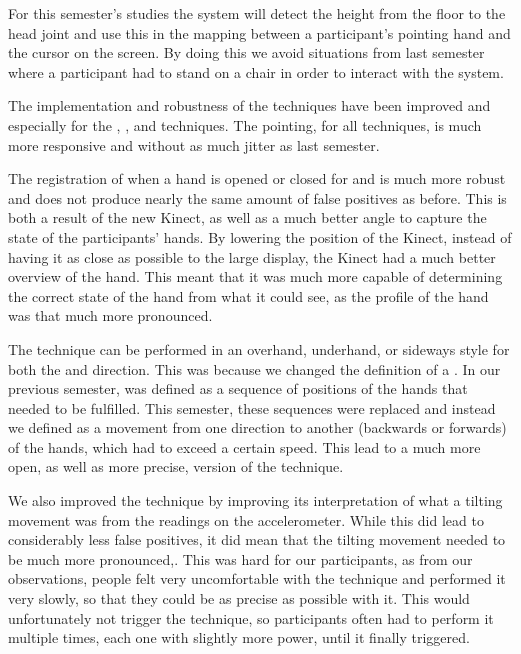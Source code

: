 For this semester's studies the system will detect the height from the floor to the head joint and use this in the mapping between a participant's pointing hand and the cursor on the screen.
By doing this we avoid situations from last semester where a participant had to stand on a chair in order to interact with the system.

The implementation and robustness of the techniques have been improved and especially for the \grab, \throw, and \tilt techniques.
The pointing, for all techniques, is much more responsive and without as much jitter as last semester.

The registration of when a hand is opened or closed for \grab \push and \grab \pull is much more robust and does not produce nearly the same amount of false positives as before.
This is both a result of the new Kinect, as well as a much better angle to capture the state of the participants' hands. 
By lowering the position of the Kinect, instead of having it as close as possible to the large display, the Kinect had a much better overview of the hand.
This meant that it was much more capable of determining the correct state of the hand from what it could see, as the profile of the hand was that much more pronounced.
   
The \throw technique can be performed in an overhand, underhand, or sideways style for both the \pull and \push direction.
This was because we changed the definition of a \throw.
In our previous semester, \throw was defined as a sequence of positions of the hands that needed to be fulfilled. 
This semester, these sequences were replaced and instead we defined \throw as a movement from one direction to another (backwards or forwards) of the hands, which had to exceed a certain speed.
This lead to a much more open, as well as more precise, version of the \throw technique. 

We also improved the \tilt technique by improving its interpretation of what a tilting movement was from the readings on the accelerometer. 
While this did lead to considerably less false positives, it did mean that the tilting movement needed to be much more pronounced,.
This was hard for our participants, as from our observations, people felt very uncomfortable with the \tilt technique and performed it very slowly, so that they could be as precise as possible with it. 
This would unfortunately not trigger the technique, so participants often had to perform it multiple times, each one with slightly more power, until it finally triggered.  


